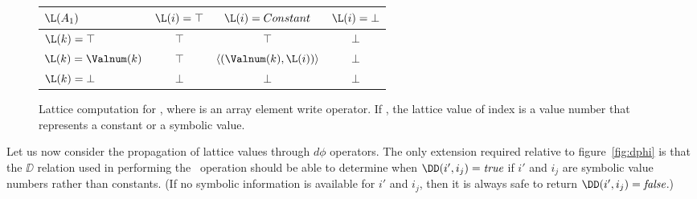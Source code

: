\begin{figure}%
\begin{center}
\begin{tabular}{|l||c|c|c|}
\hline
$\L(A_1)$ & $\L(i) = \top$ & $\L(i) = Constant$ & $\L(i) = \bot$ \\
\hline \hline
$\L(k) = \top$ & $\top$ & $\top$ & $\bot$ \\
\hline
$\L(k) = \Valnum(k)$ & $\top$ & $\langle(\Valnum(k),\L(i))\rangle$ & $\bot$ \\
\hline
$\L(k) = \bot$ & $\bot$ & $\bot$ & $\bot$ \\
\hline
\end{tabular}
\end{center}
\caption{Lattice computation for ,
where  is an 
array element write operator. If , the lattice value of index  is a value number that represents a constant or a symbolic value.}
\label{fig:symb-adef}
\end{figure}





Let us now consider
the propagation of lattice values through $d\phi$
operators.
The only extension required  relative to figure~\ref{fig:dphi} is that
the $\DD$ relation used in performing
the \Update\ operation should be able to determine when
$\DD(i',i_j)=\mbox{\it true}$ if $i'$ and $i_j$ are symbolic
value numbers rather
than constants.  (If no symbolic information is available for $i'$
and $i_j$, then it is always safe
to return $\DD(i',i_j)=\mbox{\it false}$.)





